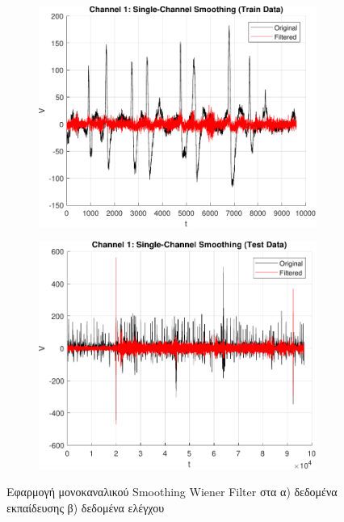 \documentclass[12pt]{article} %
\begin{document}
\begin{figure}[htbp]
    \centering
    \begin{subfigure}[b]{0.45\textwidth}
        \includegraphics[width=\textwidth]{plot/single_channel_smoothing_train.pdf}
        \caption{}
        \label{fig:single_channel_smoothing_train}
    \end{subfigure}
    \hfill
    \begin{subfigure}[b]{0.45\textwidth}
        \includegraphics[width=\textwidth]{plot/single_channel_smoothing_test.pdf}
        \caption{}
        \label{fig:single_channel_smoothing_test}
    \end{subfigure}

    \caption{Εφαρμογή μονοκαναλικού Smoothing Wiener Filter 
    στα α) δεδομένα εκπαίδευσης β) δεδομένα ελέγχου}
    \label{fig:single_channel_smoothing}
\end{figure}
\end{document}
